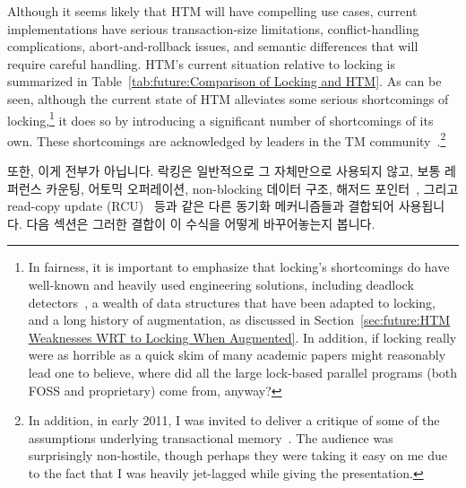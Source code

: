 Although it seems likely that HTM will have compelling use cases,
current implementations have serious transaction-size limitations,
conflict-handling complications, abort-and-rollback issues, and
semantic differences that will require careful handling.
HTM's current situation relative to locking is summarized in
Table~\ref{tab:future:Comparison of Locking and HTM}.
As can be seen, although the current state of HTM alleviates some
serious shortcomings of locking,\footnote{
	In fairness, it is important to emphasize that locking's shortcomings
	do have well-known and heavily used engineering solutions, including
	deadlock detectors~\cite{JonathanCorbet2006lockdep}, a wealth
	of data structures that have been adapted to locking, and
	a long history of augmentation, as discussed in
	Section~\ref{sec:future:HTM Weaknesses WRT to Locking When Augmented}.
	In addition, if locking really were as horrible as a quick skim
	of many academic papers might reasonably lead one to believe,
	where did all the large lock-based parallel programs (both
	FOSS and proprietary) come from, anyway?}
it does so by introducing a significant
number of shortcomings of its own.
These shortcomings are acknowledged by leaders in the TM
community~\cite{AlexanderMatveev2012PessimisticTM}.\footnote{
	In addition, in early 2011, I was invited to deliver a critique of
	some of the assumptions underlying transactional
	memory~\cite{PaulEMcKenney2011Verico}.
	The audience was surprisingly non-hostile, though perhaps they
	were taking it easy on me due to the fact that I was heavily
	jet-lagged while giving the presentation.}
\fi

또한, 이게 전부가 아닙니다.
락킹은 일반적으로 그 자체만으로 사용되지 않고, 보통 레퍼런스 카운팅, 어토믹
오퍼레이션, non-blocking 데이터 구조, 해저드
포인터~\cite{MagedMichael04a,HerlihyLM02}, 그리고 read-copy update
(RCU)~\cite{McKenney98,McKenney01a,ThomasEHart2007a,PaulEMcKenney2012ELCbattery}
등과 같은 다른 동기화 메커니즘들과 결합되어 사용됩니다.
다음 섹션은 그러한 결합이 이 수식을 어떻게 바꾸어놓는지 봅니다.
\iffalse

In addition, this is not the whole story.
Locking is not normally used by itself, but is instead typically
augmented by other synchronization mechanisms,
including reference counting, atomic operations, non-blocking data structures,
hazard pointers~\cite{MagedMichael04a,HerlihyLM02},
and read-copy update (RCU)~\cite{McKenney98,McKenney01a,ThomasEHart2007a,PaulEMcKenney2012ELCbattery}.
The next section looks at how such augmentation changes the equation.
\fi

